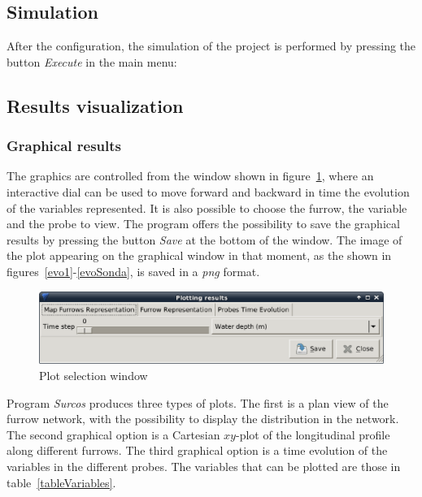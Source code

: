 \documentclass[review,authoryear]{elsarticle}
\begin{document}
\subsection{Simulation}

After the configuration, the simulation of the project is performed by pressing
the button \emph{Execute} in the main menu:

\subsection{Results visualization}

\subsubsection{Graphical results}

The graphics are controlled from the window shown in figure~\ref{barraRepres},
where an interactive dial can be used to move forward and backward in time the
evolution of the variables represented. It is also possible to choose the
furrow, the variable and the probe to view.  The program offers the possibility
to save the graphical results by pressing the button \emph{Save} at the bottom
of the window. The image of the plot appearing on the graphical window in that
moment, as the shown in figures~\ref{evo1}-\ref{evoSonda}, is saved in a
\emph{png} format.

\begin{figure}[!ht]
\begin{center}
\includegraphics[width=706\UNIT]{menuRepresEN.eps}
\caption{Plot selection window}\label{barraRepres}
\end{center}
\end{figure}

Program \emph{Surcos} produces three types of plots. The first is a plan view of
the furrow network, with the possibility to display the distribution in the
network. The second graphical option is a Cartesian $xy$-plot of the
longitudinal profile along different furrows. The third graphical option is a
time evolution of the variables in the different probes. The variables that can
be plotted are those in table~\ref{tableVariables}.
\end{document}
